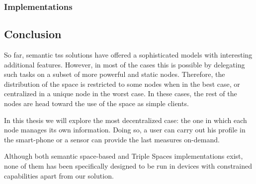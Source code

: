 








\subsubsection{Implementations}



\subsection{Conclusion}


So far, semantic \aclp{ts} solutions have offered a sophisticated models with interesting additional features.
However, in most of the cases this is possible by delegating such tasks on a subset of more powerful and static nodes.
Therefore, the distribution of the space is restricted to some nodes when in the best case, or centralized in a unique node in the worst case.
In these cases, the rest of the nodes are head toward the use of the space as simple clients.


In this thesis we will explore the most decentralized case: the one in which each node manages its own information.
Doing so, a user can carry out his profile in the smart-phone or a sensor can provide the last measures on-demand.



Although both semantic space-based and Triple Spaces implementations exist, none of them has been specifically designed to be run in devices with constrained capabilities apart from our solution.